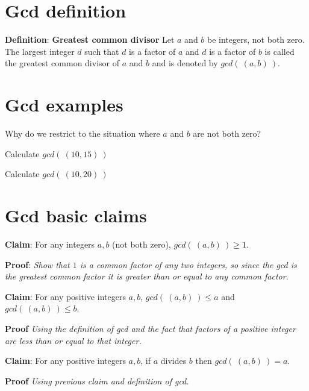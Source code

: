 \documentclass[12pt, oneside]{article}
\begin{document}
\section*{Gcd definition}


{\bf Definition}: {\bf Greatest common divisor} Let $a$ and $b$ be integers, not both zero. The largest integer $d$ such that 
$d$ is a  factor of $a$ and $d$ is a factor of  $b$ is called the greatest common divisor of $a$ and $b$ 
and is denoted by $gcd(~(a, b)~)$. \vfill
\section*{Gcd examples}


Why do we restrict to the situation where $a$ and $b$ are not both zero?

\vspace{50pt}


Calculate $gcd(~(10,15)~)$

\vspace{50pt}

Calculate $gcd(~(10,20)~)$

\vspace{50pt} \vfill
\section*{Gcd basic claims}


{\bf Claim}: For any integers $a,b$ (not both zero), $gcd(~(a,b)~) \geq 1$.

{\bf Proof}: {\it Show that $1$ is a common factor of any two integers, so since the gcd 
is the greatest common factor it is greater than or equal to any common factor.}

\vspace{150pt}

{\bf Claim}: For any positive integers $a,b$, $gcd(~(a,b)~) \leq a$ and $gcd( ~(a,b)~) \leq b$.

{\bf Proof} {\it Using the definition of gcd and the fact that factors of a positive integer
are less than or equal to that integer.}

\vspace{150pt}

{\bf Claim}: For any positive integers $a,b$, if $a$ divides $b$ then $gcd(~(a,b)~) = a$.

{\bf Proof} {\it Using previous claim and definition of gcd.}

\vspace{150pt}
\end{document}
